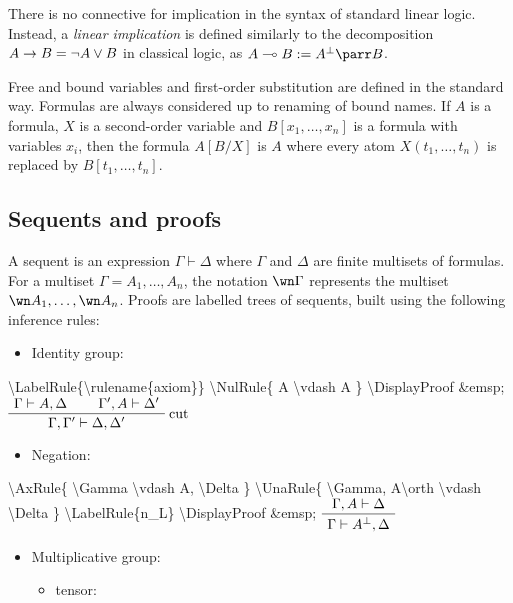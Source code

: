 There is no connective for implication in the syntax of standard linear
logic. Instead, a \emph{linear implication} is defined similarly to the
decomposition \(A\rightarrow B=\neg A\vee B\) in classical logic, as
\(A\limp B:=A\orth\parr B\).

Free and bound variables and first-order substitution are defined in the
standard way. Formulas are always considered up to renaming of bound
names. If \(A\) is a formula, \(X\) is a second-order variable and
\(B[x_1,\ldots,x_n]\) is a formula with variables \(x_i\), then the
formula \(A[B/X]\) is \(A\) where every atom \(X(t_1,\ldots,t_n)\) is
replaced by \(B[t_1,\ldots,t_n]\).

\subsection{Sequents and proofs}\label{sequents-and-proofs}

A sequent is an expression \(\Gamma\vdash\Delta\) where \(\Gamma\) and
\(\Delta\) are finite multisets of formulas. For a multiset
\(\Gamma=A_1,\ldots,A_n\), the notation \(\wn\Gamma\) represents the
multiset \(\wn A_1,\ldots,\wn A_n\). Proofs are labelled trees of
sequents, built using the following inference rules:

\begin{itemize}
\tightlist
\item
  Identity group: 
\end{itemize}

\textbackslash{}LabelRule\{\textbackslash{}rulename\{axiom\}\}
\textbackslash{}NulRule\{ A \textbackslash{}vdash A \}
\textbackslash{}DisplayProof \&emsp;
\(\AxRule{ \Gamma \vdash A, \Delta }
\AxRule{ \Gamma', A \vdash \Delta' }
\LabelRule{\rulename{cut}}
\BinRule{ \Gamma, \Gamma' \vdash \Delta, \Delta' }
\DisplayProof\)

\begin{itemize}
\tightlist
\item
  Negation: 
\end{itemize}

\textbackslash{}AxRule\{ \textbackslash{}Gamma \textbackslash{}vdash A,
\textbackslash{}Delta \} \textbackslash{}UnaRule\{
\textbackslash{}Gamma, A\textbackslash{}orth \textbackslash{}vdash
\textbackslash{}Delta \} \textbackslash{}LabelRule\{n\_L\}
\textbackslash{}DisplayProof \&emsp;
\(\AxRule{ \Gamma, A \vdash \Delta }
\UnaRule{ \Gamma \vdash A\orth, \Delta }
\LabelRule{n_R}
\DisplayProof\)

\begin{itemize}
\tightlist
\item
  Multiplicative group:

  \begin{itemize}
  \tightlist
  \item
    tensor: 
  \end{itemize}
\end{itemize}

